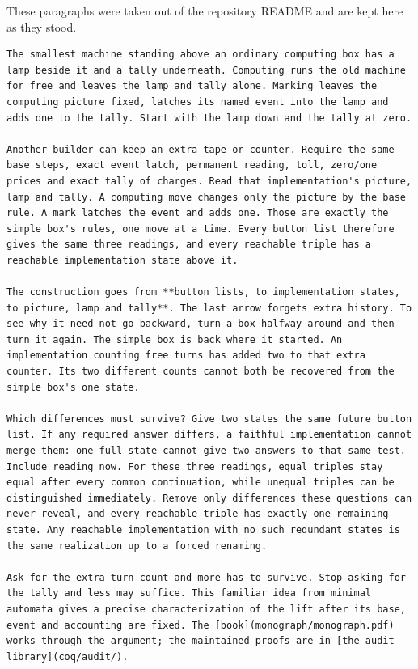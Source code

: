 \documentclass[11pt,twoside]{article}
\theoremstyle{thielethm}
\theoremstyle{thieledef}
\theoremstyle{thieledef}
\theoremstyle{thieledef}
\theoremstyle{thielethm}
\theoremstyle{thieleobs}
\theoremstyle{thielethm}
\begin{document}
These paragraphs were taken out of the repository README and are kept here as they stood.

\begin{small}\begin{verbatim}
The smallest machine standing above an ordinary computing box has a lamp beside it and a tally underneath. Computing runs the old machine for free and leaves the lamp and tally alone. Marking leaves the computing picture fixed, latches its named event into the lamp and adds one to the tally. Start with the lamp down and the tally at zero.

Another builder can keep an extra tape or counter. Require the same base steps, exact event latch, permanent reading, toll, zero/one prices and exact tally of charges. Read that implementation's picture, lamp and tally. A computing move changes only the picture by the base rule. A mark latches the event and adds one. Those are exactly the simple box's rules, one move at a time. Every button list therefore gives the same three readings, and every reachable triple has a reachable implementation state above it.

The construction goes from **button lists, to implementation states, to picture, lamp and tally**. The last arrow forgets extra history. To see why it need not go backward, turn a box halfway around and then turn it again. The simple box is back where it started. An implementation counting free turns has added two to that extra counter. Its two different counts cannot both be recovered from the simple box's one state.

Which differences must survive? Give two states the same future button list. If any required answer differs, a faithful implementation cannot merge them: one full state cannot give two answers to that same test. Include reading now. For these three readings, equal triples stay equal after every common continuation, while unequal triples can be distinguished immediately. Remove only differences these questions can never reveal, and every reachable triple has exactly one remaining state. Any reachable implementation with no such redundant states is the same realization up to a forced renaming.

Ask for the extra turn count and more has to survive. Stop asking for the tally and less may suffice. This familiar idea from minimal automata gives a precise characterization of the lift after its base, event and accounting are fixed. The [book](monograph/monograph.pdf) works through the argument; the maintained proofs are in [the audit library](coq/audit/).


\end{verbatim}
\end{small}
\end{document}
